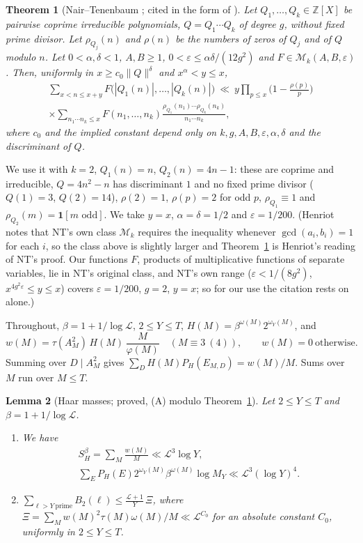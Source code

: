 \documentclass[11pt,reqno]{amsart}
\newtheorem{theorem}{Theorem}[section]
\newtheorem{lemma}[theorem]{Lemma}
\theoremstyle{definition}
\newcommand{\Lc}{\mathcal L}
\newcommand{\cM}{\mathcal M}
\begin{document}
\begin{theorem}[Nair--Tenenbaum {\cite[Thm.~1]{NT}}; cited in the form of {\cite[(1.1)]{Henriot}}]\label{thm:NT}
Let $Q_1,\dots,Q_k\in\mathbb Z[X]$ be pairwise coprime irreducible polynomials,
$Q=Q_1\cdots Q_k$ of degree $g$, without fixed prime divisor.  Let
$\rho_{Q_j}(n)$ and $\rho(n)$ be the numbers of zeros of $Q_j$ and of $Q$
modulo $n$.  Let $0<\alpha,\delta<1$, $A,B\ge1$, $0<\varepsilon\le\alpha\delta/(12g^2)$ and
$F\in\cM_k(A,B,\varepsilon)$.  Then, uniformly in $x\ge c_0\|Q\|^\delta$ and
$x^\alpha<y\le x$,
\begin{multline*}
 \sum_{x<n\le x+y}F\big(|Q_1(n)|,\dots,|Q_k(n)|\big)\ \ll\ y\prod_{p\le x}\Big(1-\frac{\rho(p)}p\Big)\\
 \times\sum_{n_1\cdots n_k\le x}F(n_1,\dots,n_k)\frac{\rho_{Q_1}(n_1)\cdots\rho_{Q_k}(n_k)}{n_1\cdots n_k},
\end{multline*}
where $c_0$ and the implied constant depend only on $k,g,A,B,\varepsilon,\alpha,\delta$
and the discriminant of $Q$.
\end{theorem}

We use it with $k=2$, $Q_1(n)=n$, $Q_2(n)=4n-1$: these are coprime and
irreducible, $Q=4n^2-n$ has discriminant $1$ and no fixed prime divisor
($Q(1)=3$, $Q(2)=14$), $\rho(2)=1$, $\rho(p)=2$ for odd $p$, $\rho_{Q_1}\equiv1$
and $\rho_{Q_2}(m)=\mathbf 1[m\text{ odd}]$.  We take $y=x$, $\alpha=\delta=1/2$ and
$\varepsilon=1/200$.  (Henriot notes that NT's own class $\cM_k$ requires the
inequality whenever $\gcd(a_i,b_i)=1$ for each $i$, so the class above is
slightly larger and Theorem~\ref{thm:NT} is Henriot's reading of NT's proof.
Our functions $F$, products of multiplicative functions of separate
variables, lie in NT's original class, and NT's own range
($\varepsilon<1/(8g^2)$, $x^{4g^2\varepsilon}\le y\le x$) covers $\varepsilon=1/200$, $g=2$, $y=x$; so
for our use the citation rests on \cite[Thm.~1]{NT} alone.)

Throughout, $\beta=1+1/\log\Lc$, $2\le Y\le T$, $H(M)=\beta^{\omega(M)}2^{\omega_Y(M)}$, and
\[
 w(M)=\tau(A_M^2)\,H(M)\,\frac M{\varphi(M)}\quad(M\equiv3\ (4)),\qquad w(M)=0\ \text{otherwise}.
\]
Summing over $D\mid A_M^2$ gives $\sum_DH(M)P_H(E_{M,D})=w(M)/M$.  Sums over $M$
run over $M\le T$.

\begin{lemma}[Haar masses; proved, (A) modulo Theorem~\ref{thm:NT}]\label{lem:masses}
Let $2\le Y\le T$ and $\beta=1+1/\log\Lc$.
\begin{enumerate}
\item[(A)] We have
\begin{gather*}
 S_H^\beta=\sum_M\frac{w(M)}M\ll\Lc^3\log Y,\\ \sum_EP_H(E)2^{\omega_Y(M)}\beta^{\omega(M)}\log M_Y\ll\Lc^3(\log Y)^4 .
\end{gather*}
\item[(B)] $\sum_{\ell>Y\ \text{prime}}B_2(\ell)\le\frac{\Lc+1}Y\,\Xi$, where
$\Xi=\sum_Mw(M)^2\tau(M)\omega(M)/M\ll\Lc^{C_0}$ for an absolute constant $C_0$,
uniformly in $2\le Y\le T$.
\end{enumerate}
\end{lemma}
\end{document}
